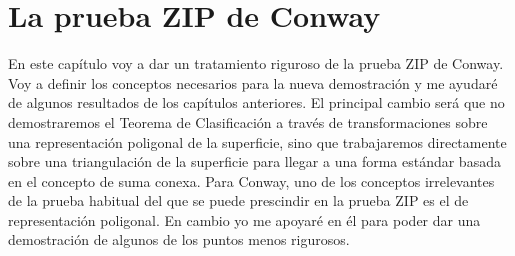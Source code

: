 \documentclass[10pt]{report}
\theoremstyle{definition}
\begin{document}

\chapter{La prueba ZIP de Conway}

En este capítulo voy a dar un tratamiento riguroso de la prueba ZIP de Conway. Voy a definir los conceptos necesarios para la nueva demostración y me ayudaré de algunos resultados de los capítulos anteriores. El principal cambio será que no demostraremos el Teorema de Clasificación a través de transformaciones sobre una representación poligonal de la superficie, sino que trabajaremos directamente sobre una triangulación de la superficie para llegar a una forma estándar basada en el concepto de suma conexa. Para Conway, uno de los conceptos irrelevantes de la prueba habitual del que se puede prescindir en la prueba ZIP es el de representación poligonal. En cambio yo me apoyaré en él para poder dar una demostración de algunos de los puntos menos rigurosos.
\end{document}
